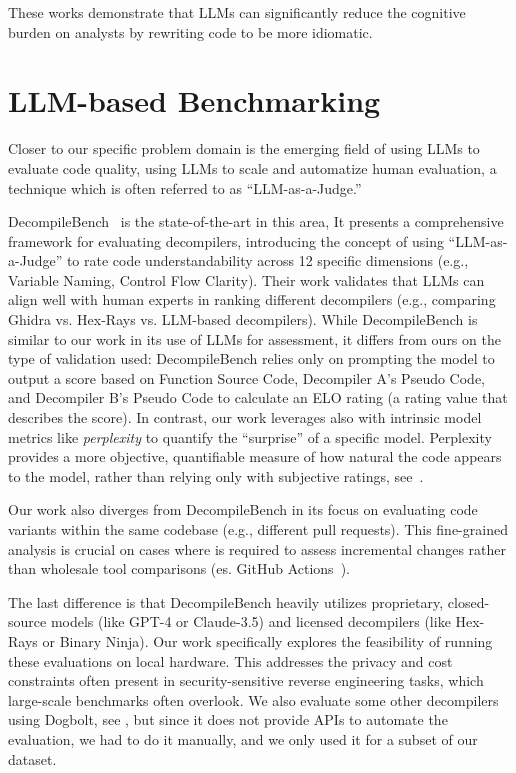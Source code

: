 These works demonstrate that \ac{LLM}s can significantly reduce the 
cognitive burden on analysts by rewriting code to be more idiomatic.

\section{LLM-based Benchmarking}\label{sec:llmbench}

Closer to our specific problem domain is the emerging field of using \ac{LLM}s to evaluate code quality, 
using \ac{LLM}s to scale and automatize human evaluation, a technique which is often referred to as ``LLM-as-a-Judge.''

DecompileBench~\cite{Paper:gao-etal-2025-decompilebench} is the state-of-the-art in this area,
It presents a comprehensive framework for evaluating decompilers, introducing the concept of using ``LLM-as-a-Judge'' to rate code 
understandability across 12 specific dimensions (e.g., Variable Naming, Control Flow Clarity). 
Their work validates that \ac{LLM}s can align well with human experts in ranking different decompilers 
(e.g., comparing Ghidra vs. Hex-Rays vs. \ac{LLM}-based decompilers).
While DecompileBench is similar to our work in its use of \ac{LLM}s for assessment, it differs from ours on the type of validation used: 
DecompileBench relies only on prompting the model to output a score based on Function Source Code, Decompiler A’s Pseudo Code, and Decompiler B’s Pseudo Code to calculate an ELO rating (a rating value that describes the score).
In contrast, our work leverages also with intrinsic model metrics like \emph{perplexity} to quantify the ``surprise'' of a specific model. 
Perplexity provides a more objective, quantifiable measure of how natural the code appears to the model, 
rather than relying only with subjective ratings, see~.

Our work also diverges from DecompileBench in its focus on evaluating code variants
within the same codebase (e.g., different pull requests). 
This fine-grained analysis is crucial on cases where is required to assess incremental changes rather than wholesale tool comparisons (es. GitHub Actions~\cite{site:githubGitHubActions}).

The last difference is that DecompileBench heavily utilizes proprietary, closed-source models (like GPT-4 
or Claude-3.5) and licensed decompilers (like Hex-Rays or Binary Ninja). 
Our work specifically explores the feasibility of running these evaluations on local hardware. 
This addresses the privacy and cost constraints often present in security-sensitive reverse engineering tasks, 
which large-scale benchmarks often overlook. We also evaluate some other decompilers using Dogbolt, see , but since it does not provide \acp{API} to automate the evaluation, we had to do it manually, and we only used it for a subset of our dataset.

